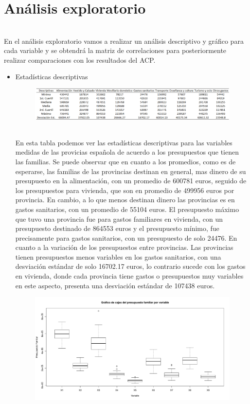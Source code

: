\documentclass[report,oneside]{revcoles}
\begin{document}
\section{Análisis exploratorio}
~\\En el análisis exploratorio vamos a realizar un análisis descriptivo y gráfico para cada variable y se obtendrá la matriz de correlaciones para posteriormente realizar comparaciones con los resultados del ACP.
\begin{itemize}
\item Estadísticas descriptivas

\begin{figure}[h!]
  \centering
  \includegraphics[scale=0.52]{FigurasUV/desc.png}
\end{figure}

~\\En esta tabla podemos ver las estadísticas descriptivas para las variables medidas de las provicias española de acuerdo a los presupuestos que tienen las familias. Se puede observar que en cuanto a los promedios, como es de esperarse, las familias de las provincias destinan en general, mas dinero de su presupuesto en la alimentación, con un promedio de 600781 euros, seguido de los presupuestos para vivienda, que son en promedio de 499956 euros por provincia. En cambio, a lo que menos destinan dinero las provincias es en gastos sanitarios, con un promedio de 55104 euros. El presupuesto máximo que tuvo una provincia fue para gastos familiares en vivienda, con un presupuesto destinado de 864553 euros y el presupuesto mínimo, fue precisamente para gastos sanitarios, con un presupuesto de solo 24476. En cuanto a la variación de los presupuestos entre provincias. Las provincias tienen presupuestos menos variables en los gastos sanitarios, con una desviación estándar de solo 16702.17 euros, lo contrario sucede con los gastos en vivienda, donde cada provincia tiene gastos o presupuestos muy variables en este aspecto, presenta una desviación estándar de 107438 euros.
\begin{figure}[h!]
  \centering
  \includegraphics[scale=0.45]{FigurasUV/cajas.pdf}
\end{figure}


\end{itemize}
\end{document}
